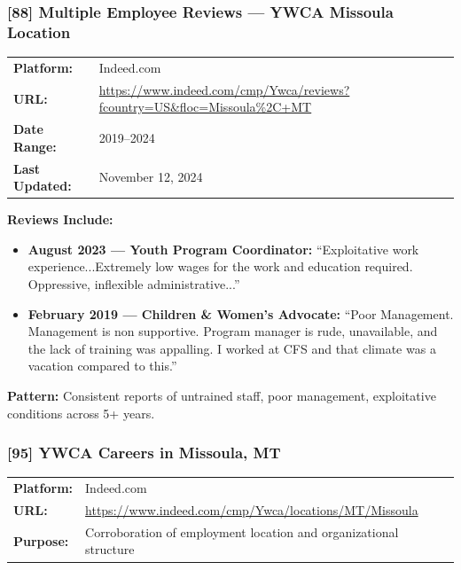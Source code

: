 \documentclass[11pt,letterpaper]{article}
\newcommand{\citeref}[1]{\textbf{\color{NavyBlue}[#1]}}
\begin{document}
\subsubsection{\citeref{88} Multiple Employee Reviews --- YWCA Missoula Location}

\begin{tabular}{@{}p{1.4in}p{4.6in}@{}}
\textbf{Platform:} & Indeed.com\\
\textbf{URL:} & \url{https://www.indeed.com/cmp/Ywca/reviews?fcountry=US&floc=Missoula\%2C+MT}\\
\textbf{Date Range:} & 2019--2024\\
\textbf{Last Updated:} & November 12, 2024\\
\end{tabular}

\vspace{0.1in}

\textbf{Reviews Include:}
\begin{itemize}[leftmargin=*]
\item \textbf{August 2023 --- Youth Program Coordinator:} ``Exploitative work experience...Extremely low wages for the work and education required. Oppressive, inflexible administrative...''
\item \textbf{February 2019 --- Children \& Women's Advocate:} ``Poor Management. Management is non supportive. Program manager is rude, unavailable, and the lack of training was appalling. I worked at CFS and that climate was a vacation compared to this.''
\end{itemize}

\textbf{Pattern:} Consistent reports of untrained staff, poor management, exploitative conditions across 5+ years.

\subsubsection{\citeref{95} YWCA Careers in Missoula, MT}

\begin{tabular}{@{}p{1.4in}p{4.6in}@{}}
\textbf{Platform:} & Indeed.com\\
\textbf{URL:} & \url{https://www.indeed.com/cmp/Ywca/locations/MT/Missoula}\\
\textbf{Purpose:} & Corroboration of employment location and organizational structure\\
\end{tabular}

\newpage
\end{document}
